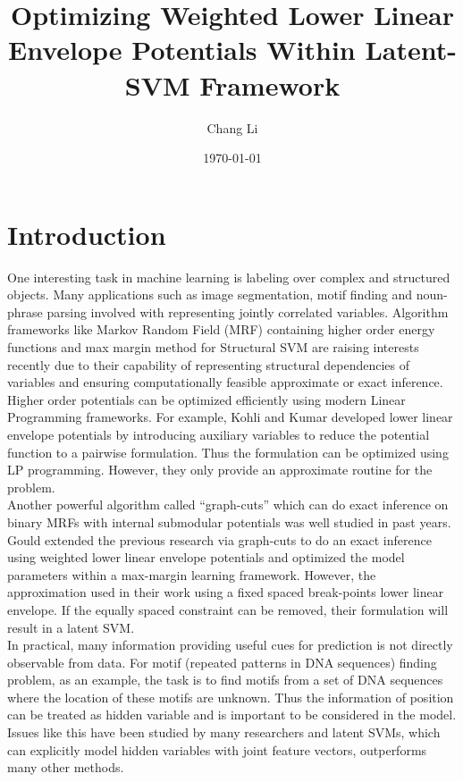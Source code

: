 \documentclass{article}
\title{Optimizing Weighted Lower Linear Envelope Potentials Within Latent-SVM Framework}
\author{Chang Li}
\date{\today}
\begin{document}
	\maketitle
	
	\section{Introduction}
	One interesting task in machine learning is labeling over complex and structured objects. Many applications such as image segmentation, motif finding and noun-phrase parsing involved with representing jointly correlated variables. Algorithm frameworks like Markov Random Field (MRF) containing higher order energy functions and max margin method for Structural SVM are raising interests recently due to their capability of representing structural dependencies of variables and ensuring computationally feasible approximate or exact inference. \\
	Higher order potentials can be optimized efficiently using modern Linear Programming frameworks. For example, Kohli and Kumar\cite{kohli2009robust} developed lower linear envelope potentials by introducing auxiliary variables to reduce the potential function to a pairwise formulation. Thus the formulation can be optimized using LP programming. However, they only provide an approximate routine for the problem.\\ Another powerful algorithm called “graph-cuts” which can do exact inference on binary MRFs with internal submodular potentials was well studied in past years. Gould\cite{gouldlearning} extended the previous research via graph-cuts to do an exact inference using weighted lower linear envelope potentials and optimized the model parameters within a max-margin learning framework. However, the approximation used in their work using a fixed spaced break-points lower linear envelope. If the equally spaced constraint can be removed, their formulation will result in a latent SVM.\\
	In practical, many information providing useful cues for prediction is not directly observable from data. For motif (repeated patterns in DNA sequences) finding problem, as an example, the task is to find motifs from a set of DNA sequences where the location of these motifs are unknown. Thus the information of position can be treated as hidden variable and is important to be considered in the model. Issues like this have been studied by many researchers and latent SVMs, which can explicitly model hidden variables with joint feature vectors, outperforms many other methods. \\
\end{document}
